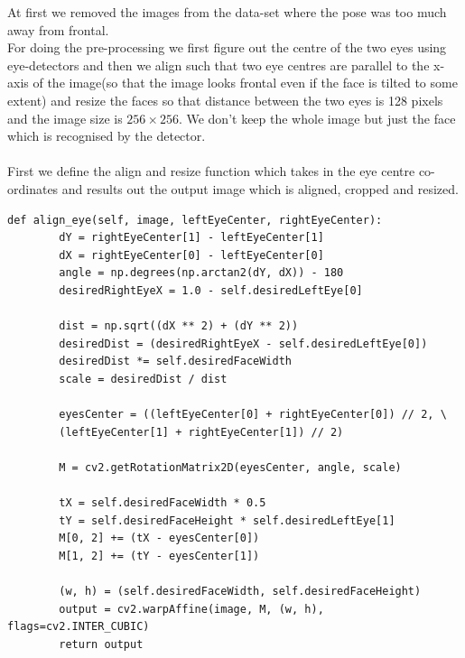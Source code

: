 At first we removed the images from the data-set where the pose was too much away from frontal.\\
For doing the pre-processing we first figure out the centre of the two eyes using eye-detectors and then we align such that two eye centres are parallel to the x-axis of the image(so that the image looks frontal even if the face is tilted to some extent) and resize the faces so that distance between the two eyes is 128 pixels and the image size is $256\times 256$. We don't keep the whole image but just the face which is recognised by the detector.\\ \\
First we define the align and resize function which takes in the eye centre co-ordinates and results out the output image which is aligned, cropped and resized.

\begin{lstlisting}[style=Python]
    def align_eye(self, image, leftEyeCenter, rightEyeCenter):
		dY = rightEyeCenter[1] - leftEyeCenter[1]
		dX = rightEyeCenter[0] - leftEyeCenter[0]
		angle = np.degrees(np.arctan2(dY, dX)) - 180
		desiredRightEyeX = 1.0 - self.desiredLeftEye[0]

		dist = np.sqrt((dX ** 2) + (dY ** 2))
		desiredDist = (desiredRightEyeX - self.desiredLeftEye[0])
		desiredDist *= self.desiredFaceWidth
		scale = desiredDist / dist

		eyesCenter = ((leftEyeCenter[0] + rightEyeCenter[0]) // 2, \
		(leftEyeCenter[1] + rightEyeCenter[1]) // 2)

		M = cv2.getRotationMatrix2D(eyesCenter, angle, scale)

		tX = self.desiredFaceWidth * 0.5
		tY = self.desiredFaceHeight * self.desiredLeftEye[1]
		M[0, 2] += (tX - eyesCenter[0])
		M[1, 2] += (tY - eyesCenter[1])

		(w, h) = (self.desiredFaceWidth, self.desiredFaceHeight)
		output = cv2.warpAffine(image, M, (w, h), flags=cv2.INTER_CUBIC)
		return output
\end{lstlisting}

